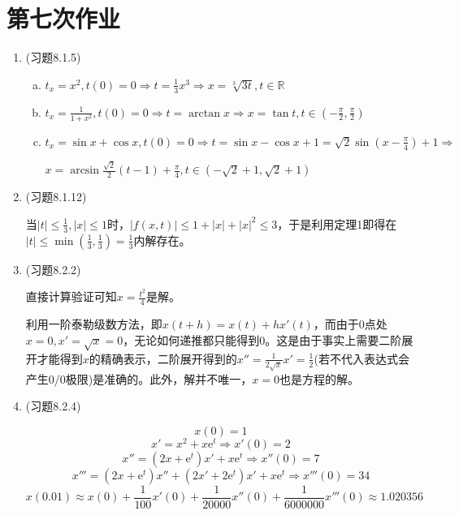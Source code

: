 \documentclass[a4paper,UTF8,fontset=windows]{ctexart}
\begin{document}
\section{第七次作业}
\begin{enumerate}
    \item (习题8.1.5)
    \begin{enumerate}[a.]
    \item
    $t_x=x^2,t(0)=0\Rightarrow t=\frac{1}{3}x^3\Rightarrow x=\sqrt[3]{3t},t\in\mathbb{R}$
    \item
    $t_x=\frac{1}{1+x^2},t(0)=0\Rightarrow t=\arctan{x}\Rightarrow x=\tan{t}, t\in(-\frac{\pi}{2},\frac{\pi}{2})$
    \item
    $t_x=\sin{x}+\cos{x},t(0)=0\Rightarrow t=\sin{x}-\cos{x}+1=\sqrt{2}\sin(x-\frac{\pi}{4})+1\Rightarrow$
    
    $x=\arcsin\frac{\sqrt2}{2}(t-1)+\frac{\pi}{4},t\in(-\sqrt{2}+1,\sqrt{2}+1)$
    \end{enumerate}
    
    \item (习题8.1.12)
    
    当$|t|\le\frac{1}{3},|x|\le1$时，$|f(x,t)|\le1+|x|+|x|^2\le 3$，于是利用定理1即得在$|t|\le\min(\frac{1}{3},\frac{1}{3})=\frac{1}{3}$内解存在。
    
    \item (习题8.2.2)
    
    直接计算验证可知$x=\frac{t^2}{4}$是解。
    
    利用一阶泰勒级数方法，即$x(t+h)=x(t)+hx'(t)$，而由于0点处$x=0,x'=\sqrt{x}=0$，无论如何递推都只能得到0。这是由于事实上需要二阶展开才能得到$x$的精确表示，二阶展开得到的$x''=\frac{1}{2\sqrt{x}}x'=\frac{1}{2}$(若不代入表达式会产生0/0极限)是准确的。此外，解并不唯一，$x=0$也是方程的解。
    
    \item (习题8.2.4)
    
    $$x(0)=1$$
    $$x'=x^2+x\mathrm{e}^t\Rightarrow x'(0)=2$$
    $$x''=(2x+\mathrm{e}^t)x'+x\mathrm{e}^t\Rightarrow x''(0)=7$$
    $$x'''=(2x+\mathrm{e}^t)x''+(2x'+2\mathrm{e}^t)x'+x\mathrm{e}^t\Rightarrow x'''(0)=34$$
    $$x(0.01)\approx x(0)+\frac{1}{100}x'(0)+\frac{1}{20000}x''(0)+\frac{1}{6000000}x'''(0)\approx1.020356$$
\end{enumerate}
\end{document}
